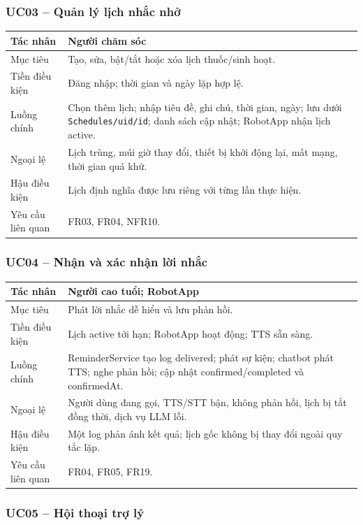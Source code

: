 \subsubsection*{UC03 -- Quản lý lịch nhắc nhở}

\begin{longtable}{|p{3.3cm}|p{10.1cm}|}
\hline
Tác nhân & Người chăm sóc \\
\hline
Mục tiêu & Tạo, sửa, bật/tắt hoặc xóa lịch thuốc/sinh hoạt. \\
\hline
Tiền điều kiện & Đăng nhập; thời gian và ngày lặp hợp lệ. \\
\hline
Luồng chính & Chọn thêm lịch; nhập tiêu đề, ghi chú, thời gian, ngày; lưu dưới \texttt{Schedules/uid/id}; danh sách cập nhật; RobotApp nhận lịch active. \\
\hline
Ngoại lệ & Lịch trùng, múi giờ thay đổi, thiết bị khởi động lại, mất mạng, thời gian quá khứ. \\
\hline
Hậu điều kiện & Lịch định nghĩa được lưu riêng với từng lần thực hiện. \\
\hline
Yêu cầu liên quan & FR03, FR04, NFR10. \\
\hline
\end{longtable}

\subsubsection*{UC04 -- Nhận và xác nhận lời nhắc}

\begin{longtable}{|p{3.3cm}|p{10.1cm}|}
\hline
Tác nhân & Người cao tuổi; RobotApp \\
\hline
Mục tiêu & Phát lời nhắc dễ hiểu và lưu phản hồi. \\
\hline
Tiền điều kiện & Lịch active tới hạn; RobotApp hoạt động; TTS sẵn sàng. \\
\hline
Luồng chính & ReminderService tạo log delivered; phát sự kiện; chatbot phát TTS; nghe phản hồi; cập nhật confirmed/completed và confirmedAt. \\
\hline
Ngoại lệ & Người dùng đang gọi, TTS/STT bận, không phản hồi, lịch bị tắt đồng thời, dịch vụ LLM lỗi. \\
\hline
Hậu điều kiện & Một log phản ánh kết quả; lịch gốc không bị thay đổi ngoài quy tắc lặp. \\
\hline
Yêu cầu liên quan & FR04, FR05, FR19. \\
\hline
\end{longtable}

\subsubsection*{UC05 -- Hội thoại trợ lý}

